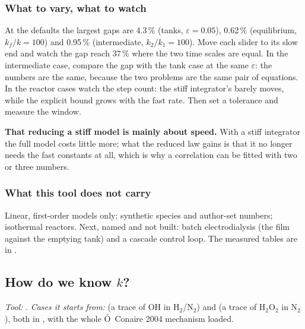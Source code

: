 \documentclass[11pt,a4paper]{article}
\begin{document}
\subsubsection*{What to vary, what to watch}

\begin{tryit}
At the defaults the largest gaps are 4.3\,\% (tanks, $\varepsilon = 0.05$),
0.62\,\% (equilibrium, $k_f/k = 100$) and 0.95\,\% (intermediate,
$k_2/k_1 = 100$).  Move each slider to its slow end and watch the gap reach
37\,\% where the two time scales are equal.  In the intermediate case, compare
the gap with the tank case at the same $\varepsilon$: the numbers are the same,
because the two problems are the same pair of equations.  In the reactor cases
watch the step count: the stiff integrator's barely moves, while the explicit
bound grows with the fast rate.  Then set a tolerance and measure the window.
\end{tryit}

\begin{pitfall}
\textbf{That reducing a stiff model is mainly about speed.}  With a stiff
integrator the full model costs little more; what the reduced law gains is that
it no longer needs the fast constants at all, which is why a correlation can be
fitted with two or three numbers.
\end{pitfall}

\subsubsection*{What this tool does not carry}

Linear, first-order models only; synthetic species and author-set numbers;
isothermal reactors.  Next, named and not built: batch electrodialysis (the
film against the emptying tank) and a cascade control loop.  The measured
tables are in .

\subsection{How do we know $k$?}\label{sec:edu-how-do-we-know-k}


\noindent\textit{\small Tool:} .  \textit{\small
Cases it starts from:}  (a trace of OH in H$_2$/N$_2$)
and  (a trace of H$_2$O$_2$ in N$_2$), both in
, with the whole \'O~Conaire 2004 mechanism
loaded.
\end{document}
